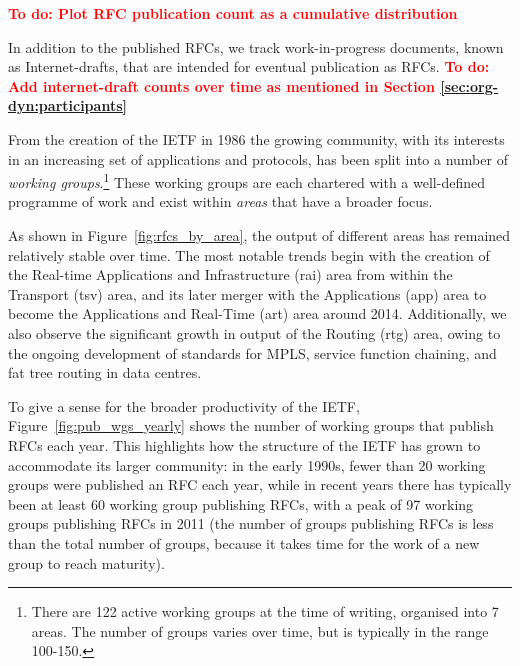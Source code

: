\documentclass[twocolumn,10pt]{article}
\newcommand{\todo}[1]{\textbf{\textcolor{red}{To do: #1}}}
\newcommand{\pb}[1]{\vspace{0.75ex}\noindent{\textbf{#1}}}
\begin{document}
\todo{Plot RFC publication count as a cumulative distribution}

In addition to the published RFCs, we track work-in-progress documents,
known as Internet-drafts, that are intended for eventual publication as
RFCs.
\todo{Add internet-draft counts over time as mentioned in Section \ref{sec:org-dyn:participants}}

\pb{Role of Working Groups:}
From the creation of the IETF in 1986 the growing community, with its
interests in an increasing set of applications and protocols, has been
split into a number of \emph{working groups}.\footnote{There are 122
active working groups at the time of writing, organised into 7 areas.
The number of groups varies over time, but is typically in the range
100-150.} These working groups are each chartered with a well-defined
programme of work and exist within \emph{areas} that have a broader focus.  

As shown in Figure~\ref{fig:rfcs_by_area}, the output of
different areas has remained relatively stable over time. The most notable
trends begin with the creation of the Real-time Applications and
Infrastructure (rai) area from within the Transport (tsv) area, and its
later merger with the Applications (app) area to become the Applications
and Real-Time (art) area around 2014. Additionally, we also observe the
significant growth in output of the Routing (rtg) area, owing to the
ongoing development of standards for MPLS, service function chaining, and
fat tree routing in data centres.

To give a sense for the broader productivity of the IETF,
Figure~\ref{fig:pub_wgs_yearly} shows the number of working groups that
publish RFCs each year. This highlights how the structure of the IETF has
grown to accommodate its larger community: in the early 1990s, fewer than
20 working groups were published an RFC each year, while in recent years
there has typically been at least 60 working group publishing RFCs, with
a peak of 97 working groups publishing RFCs in 2011 (the number of groups
publishing RFCs is less than the total number of groups, because it takes
time for the work of a new group to reach maturity).
\end{document}
